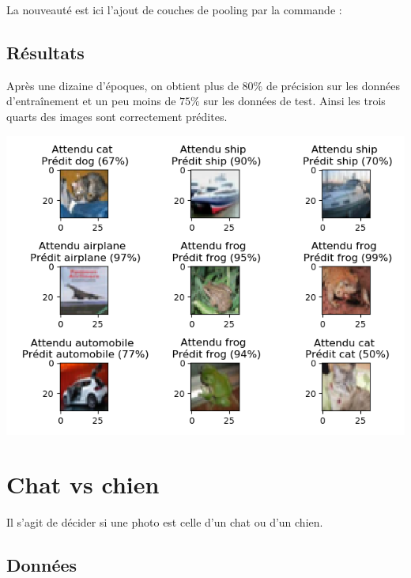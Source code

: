 \documentclass[11pt,class=report,crop=false]{standalone}
\begin{document}
La nouveauté est ici l'ajout de couches de pooling par la commande :

\subsection{Résultats}

Après une dizaine d'époques, on obtient plus de $80\%$ de précision sur les données d'entraînement et un peu moins de $75\%$ sur les données de test. Ainsi les trois quarts des images sont correctement prédites.

\begin{center}
\includegraphics[scale=\myscale,scale=0.7]{figures/tfconv-images-test}
\end{center}



\section{Chat vs chien}

Il s'agit de décider si une photo est celle d'un chat ou d'un chien.

\subsection{Données}
\end{document}
